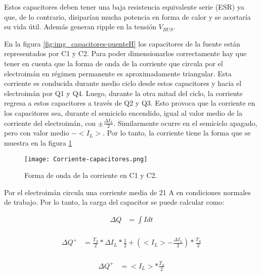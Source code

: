 \noindent Estos capacitores deben tener una baja resistencia equivalente serie (ESR) ya que, de lo contrario, disiparían mucha potencia en forma de calor y se acortaría su vida útil. Además generan ripple en la tensión $V_{BUS}$.

\noindent En la figura \ref{fig:img_capacitores-puenteH} los capacitores de la fuente están representados por C1 y C2. Para poder dimensionarlos correctamente hay que tener en cuenta que la forma de onda de la corriente que circula por el electroimán en régimen permanente es aproximadamente triangular. Esta corriente es conducida durante medio ciclo desde estos capacitores y hacia el electroimán por Q1 y Q4. Luego, durante la otra mitad del ciclo, la corriente regresa a estos capacitores a través de Q2 y Q3. Esto provoca que la corriente en los capacitores sea, durante el semiciclo encendido, igual al valor medio de la corriente del electroimán, con $ \pm \frac{\Delta I_L}{2}$. Similarmente ocurre en el semiciclo apagado, pero con valor medio $-<I_L>$.  Por lo tanto,  la corriente tiene la forma que se muestra en la figura \ref{fig:img_ccorriente-capacitores}

\begin{figure}[H]
	\centering
	\texttt{[image: Corriente-capacitores.png]}
	\caption{Forma de onda de la corriente en C1 y C2.}
	\label{fig:img_ccorriente-capacitores}
\end{figure}

\noindent Por el electroimán circula una corriente media de 21 A en condiciones normales de trabajo. Por lo tanto, la carga del capacitor se puede calcular como:

\begin{equation} 
	\begin{aligned}
   	\Delta Q &= \int I dt\\	
	\end{aligned}
\end{equation}

\begin{equation} 
	\begin{aligned}
		\Delta Q ^+ &= \frac{T_S}{2}*\Delta I_L * \frac{1}{2} + (<I_L> -\frac{\Delta I_L}{2})*\frac{T_S}{2}\\
	\end{aligned}
\end{equation}

\begin{equation} 
	\begin{aligned}
		\Delta Q ^+ &= <I_L> *\frac{T_S}{2}\\
	\end{aligned}
\end{equation}

